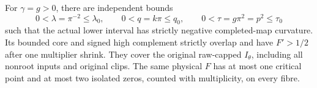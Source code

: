 \begin{proposition}
\label{deg:prop-positive-far}
For \(\gamma=g>0\), there are independent bounds
\begin{equation}\label{deg:positive-far-range}
 0<\lambda=\pi^{-2}\le\lambda_0,\qquad
 0<q=k\pi\le q_0,\qquad 0<\tau=g\pi^2=p^2\le\tau_0
\end{equation}
such that the actual lower interval has strictly negative completed-map
curvature. Its bounded core and signed high complement strictly overlap
and have \(F'>1/2\) after one multiplier shrink. They cover the
original raw-capped \(I_\theta\), including all nonroot inputs and
original clips. The same physical \(F\) has at most one critical point
and at most two isolated zeros, counted with multiplicity, on every fibre.
\end{proposition}

